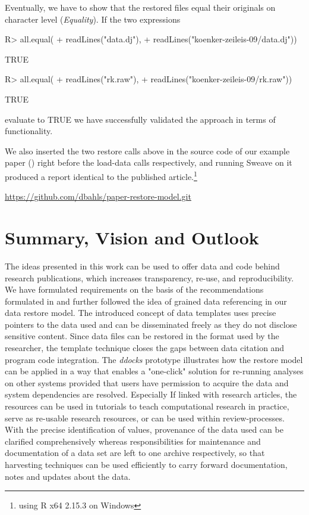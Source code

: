 \documentclass{acm_proc_article-sp}
\begin{document}
Eventually, we have to show that the restored files equal their originals on character level (\textit{Equality}).
If the two expressions
\begin{Schunk}
\begin{Sinput}
R> all.equal(
+    readLines("data.dj"), 
+    readLines("koenker-zeileis-09/data.dj")) 
\end{Sinput}
\begin{Soutput}
[1] TRUE
\end{Soutput}
\begin{Sinput}
R> all.equal(
+    readLines("rk.raw"), 
+    readLines("koenker-zeileis-09/rk.raw")) 
\end{Sinput}
\begin{Soutput}
[1] TRUE
\end{Soutput}
\end{Schunk}
evaluate to TRUE we have successfully validated the approach in terms of functionality.

We also inserted the two restore calls above in the source code of our example paper (\cite{koenkerzeileis09}) right before the load-data calls respectively, and running Sweave on it produced a report identical to the published article.\footnote{using R x64 2.15.3 on Windows}


%
%
\url{https://github.com/dbahls/paper-restore-model.git}


\section{Summary, Vision and Outlook}\label{sec:outlook}


The ideas presented in this work can be used to offer data and code behind research publications, which increases transparency, re-use, and reproducibility.
We have formulated requirements on the basis of the recommendations formulated in \cite{RePEc_ejw_journl_v_4_y_2007_i_3_p_326_337} and further followed the idea of grained data referencing in our data restore model.
The introduced concept of data templates uses precise pointers to the data used and can be disseminated freely as they do not disclose sensitive content.
Since data files can be restored in the format used by the researcher, the template technique closes the gaps between data citation and program code integration.
The \textit{ddocks} prototype illustrates how the restore model can be applied in a way that enables a "one-click" solution for re-running analyses on other systems provided that users have permission to acquire the data and system dependencies are resolved.
Especially If linked with research articles, the resources can be used in tutorials to teach computational research in practice, serve as re-usable research resources, or can be used within review-processes.
With the precise identification of values, provenance of the data used can be clarified comprehensively whereas responsibilities for maintenance and documentation of a data set are left to one archive respectively, so that harvesting techniques can be used efficiently to carry forward documentation, notes and updates about the data.
\end{document}
